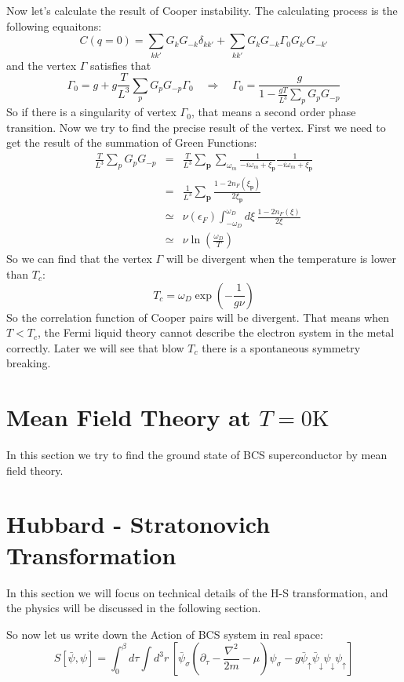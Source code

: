\documentclass{article}
\newcommand{\mtp}{\mathbf{p}}
\newcommand{\uspin}{\uparrow}
\newcommand{\dspin}{\downarrow}
\begin{document}
Now let's calculate the result of Cooper instability. The calculating process is the following equaitons:
\begin{equation}
C(q=0) =\sum_{kk'} G_k G_{-k}\delta_{kk'} + \sum_{kk'}G_{k}G_{-k}\Gamma_0 G_{k'}G_{-k'}
\end{equation}
and the vertex $\Gamma$ satisfies that
$$
\Gamma_0 = g + g\frac{T}{L^3}\sum_{p}G_{p}G_{-p}\Gamma_0 \quad\Rightarrow\quad \Gamma_0 = \frac{g}{1-\frac{gT}{L^3}\sum_{p}G_p G_{-p}}
$$
So if there is a singularity of vertex $\Gamma_0$, that means a second order phase transition. Now we try to find the precise result of the vertex. First we need to get the result of the summation of Green Functions:
\begin{eqnarray}
\frac{T}{L^3}\sum_p G_p G_{-p} &=& \frac{T}{L^3}\sum_{\mtp}\sum_{\omega_m}\frac{1}{-i\omega_m +\xi_\mtp}\frac{1}{-i\omega_m + \xi_\mtp}\nonumber\\
&=& \frac{1}{L^3}\sum_\mtp \frac{1-2n_F(\xi_\mtp)}{2\xi_\mtp}\nonumber\\
&\simeq&\nu(\epsilon_F)\int_{-\omega_D}^{\omega_D}d\xi\,\frac{1-2n_F(\xi)}{2\xi}\nonumber\\
&\simeq& \nu \ln\left(\frac{\omega_D}{T}\right)
\end{eqnarray}
So we can find that the vertex $\Gamma$ will be divergent when the temperature is lower than $T_c$:
$$
T_c = \omega_D \exp\left(-\frac{1}{g\nu}\right)
$$
So the correlation function of Cooper pairs will be divergent. That means when $T<T_c$, the Fermi liquid theory cannot describe the electron system in the metal correctly. Later we will see that blow $T_c$ there is a spontaneous symmetry breaking.  

\section{Mean Field Theory at $T = 0\mathrm{K}$}
In this section we try to find the ground state of BCS superconductor by mean field theory.

\section{Hubbard - Stratonovich Transformation}
In this section we will focus on technical details of the H-S transformation, and the physics will be discussed in the following section.

So now let us write down the Action of BCS system in real space:
\begin{equation}
S[\bar{\psi},\psi] = \int^\beta_0d\tau\int d^3r\,\left[\bar{\psi}_\sigma\left(\partial_\tau-\frac{\nabla^2}{2m}-\mu\right)\psi_\sigma - g\bar{\psi}_\uspin\bar{\psi}_\dspin\psi_\dspin\psi_\uspin\right]
\end{equation}
\end{document}
